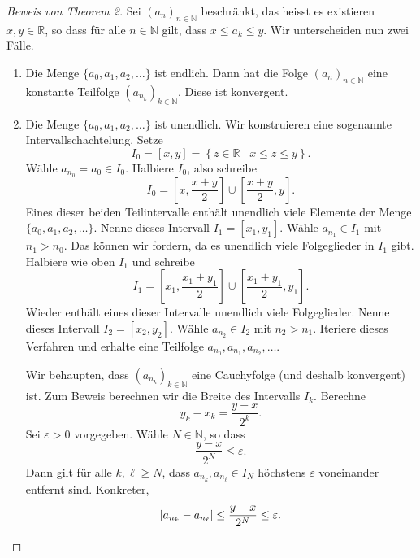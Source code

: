 \documentclass[../main.tex]{subfiles}
\begin{document}
\begin{proof}[Beweis von Theorem 2]
  Sei ${(a_n)}_{n \in \mathbb{N}}$ beschränkt, das heisst
  es existieren $x, y \in \mathbb{R}$, so dass für
  alle $n \in \mathbb{N}$ gilt, dass $x \leq a_k \leq y$.
  Wir unterscheiden nun zwei Fälle.
  \begin{enumerate}[1.]
    \item Die Menge $\{a_0, a_1, a_2, \dots\}$ ist endlich.
      Dann hat die Folge ${(a_n)}_{n \in \mathbb{N}}$ 
      eine konstante Teilfolge
      ${(a_{n_k})}_{k \in \mathbb{N}}$.
      Diese ist konvergent.
    \item Die Menge $\{a_0, a_1, a_2, \dots\}$ ist unendlich.
      Wir konstruieren eine sogenannte Intervallschachtelung.
      Setze 
      \[
        I_0 = [x, y] = \left\{z \in \mathbb{R} 
        \mid x \leq z \leq y\right\}.
      \]
      Wähle $a_{n_0} = a_0 \in I_0$. Halbiere $I_0$, also
      schreibe
      \[
        I_0 = \left[ x, \frac{x+y}{2} \right] 
        \cup \left[ \frac{x+y}{2}, y \right] .
      \]
      Eines dieser beiden Teilintervalle enthält
      unendlich viele Elemente der Menge
      $\{a_0, a_1, a_2, \dots\}$. Nenne dieses Intervall
      $I_1 = [x_1, y_1]$. Wähle $a_{n_1} \in I_1$
      mit $n_1 > n_0$. Das können wir fordern,
      da es unendlich viele Folgeglieder in 
      $I_1$ gibt.
      Halbiere wie oben $I_1$ und schreibe
      \[
        I_1 = \left[ x_1, \frac{x_1 + y_1}{2} \right] 
        \cup \left[ \frac{x_1 + y_1}{2}, y_1 \right] .
      \]
      Wieder enthält eines dieser Intervalle
      unendlich viele Folgeglieder. Nenne dieses
      Intervall $I_2 = [x_2, y_2]$. Wähle
      $a_{n_2} \in I_2$ mit $n_{2} > n_1$.
      Iteriere dieses Verfahren und erhalte eine
      Teilfolge $a_{n_0}, a_{n_1}, a_{n_2}, \dots$.

      Wir behaupten, dass ${(a_{n_k})}_{k \in \mathbb{N}}$
      eine Cauchyfolge (und deshalb konvergent) ist.
      Zum Beweis berechnen wir die Breite des
      Intervalls $I_k$. Berechne
      \[
        y_k - x_k = \frac{y - x}{2^k}.
      \]
      Sei $\varepsilon > 0$ vorgegeben. Wähle
      $N \in \mathbb{N}$, so dass
      \[
        \frac{y-x}{2^N} \leq \varepsilon.
      \]
      Dann gilt für alle $k, \ell \geq N$, dass
      $a_{n_k}, a_{n_\ell} \in I_N$ höchstens
      $\varepsilon$ voneinander entfernt sind.
      Konkreter,
      \[
        |a_{n_k} - a_{n_\ell}| 
        \leq \frac{y-x}{2^N} \leq \varepsilon. \qedhere
      \]
  \end{enumerate}
\end{proof}
\end{document}
